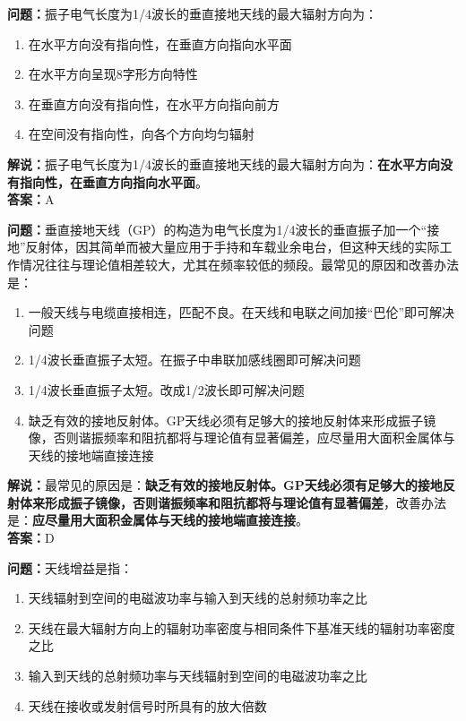 \textbf{问题：}振子电气长度为1/4波长的垂直接地天线的最大辐射方向为：

\begin{enumerate}[label=\Alph*), leftmargin=1.5cm]
	\item 在水平方向没有指向性，在垂直方向指向水平面
	\item 在水平方向呈现8字形方向特性
	\item 在垂直方向没有指向性，在水平方向指向前方
	\item 在空间没有指向性，向各个方向均匀辐射
\end{enumerate}

\textbf{解说：}振子电气长度为1/4波长的垂直接地天线的最大辐射方向为：\textbf{在水平方向没有指向性，在垂直方向指向水平面}。\\\textbf{答案：}A%



\textbf{问题：}垂直接地天线（GP）的构造为电气长度为1/4波长的垂直振子加一个“接地”反射体，因其简单而被大量应用于手持和车载业余电台，但这种天线的实际工作情况往往与理论值相差较大，尤其在频率较低的频段。最常见的原因和改善办法是：

\begin{enumerate}[label=\Alph*), leftmargin=1.5cm]
	\item 一般天线与电缆直接相连，匹配不良。在天线和电联之间加接“巴伦”即可解决问题
	\item 1/4波长垂直振子太短。在振子中串联加感线圈即可解决问题
	\item 1/4波长垂直振子太短。改成1/2波长即可解决问题
	\item 缺乏有效的接地反射体。GP天线必须有足够大的接地反射体来形成振子镜像，否则谐振频率和阻抗都将与理论值有显著偏差，应尽量用大面积金属体与天线的接地端直接连接
\end{enumerate}

\textbf{解说：}最常见的原因是：\textbf{缺乏有效的接地反射体。GP天线必须有足够大的接地反射体来形成振子镜像，否则谐振频率和阻抗都将与理论值有显著偏差}，改善办法是：\textbf{应尽量用大面积金属体与天线的接地端直接连接}。\\\textbf{答案：}D



\textbf{问题：}天线增益是指：

\begin{enumerate}[label=\Alph*), leftmargin=1.5cm]
	\item 天线辐射到空间的电磁波功率与输入到天线的总射频功率之比
	\item 天线在最大辐射方向上的辐射功率密度与相同条件下基准天线的辐射功率密度之比
	\item 输入到天线的总射频功率与天线辐射到空间的电磁波功率之比
	\item 天线在接收或发射信号时所具有的放大倍数
\end{enumerate}

